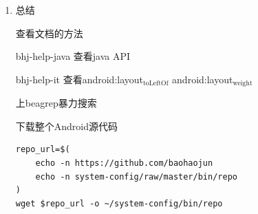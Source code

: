 \documentclass[presentation,dvipdfmx,CJKbookmarks]{beamer}
\begin{document}
\begin{CJK*}{UTF8}{simsun}
\begin{enumerate}
\begin{frame}[fragile,label={sec:orgc8b4406}]{数据传递、共享（续）}
\begin{block}{startActivityForResult}
\begin{verbatim}
setResult(RESULT_OK,
    (new Intent()).setAction("Corky!"));
\end{verbatim}
\end{block}
\begin{block}{onActivityResult}
\begin{verbatim}
protected void onActivityResult(
 int requestCode,
 int resultCode,
 Intent data) {
  if (requestCode == GET_CODE) {...}
}
\end{verbatim}
\end{block}
\end{frame}
\begin{frame}[label={sec:org852b592}]{数据传递、共享（续）}
\begin{block}{Singleton、Application}
\end{block}
\begin{block}{数据存取也是一种IPC}
\end{block}
\end{frame}

\begin{frame}[label={sec:org7b29113}]{小练习}
\begin{itemize}
\item 用Intent传递数据
\item 用startActivityForResult获取结果
\end{itemize}
\end{frame}

\item 总结
\label{sec:org1fc3930}
\begin{frame}[label={sec:org9596c90}]{查看文档的方法}
\begin{block}{bhj-help-java 查看java API}
\end{block}
\begin{block}{bhj-help-it 查看android:layout\(_{\text{toLeftOf}}\) android:layout\(_{\text{weight}}\)}
\end{block}
\begin{block}{上beagrep暴力搜索}
\end{block}
\end{frame}
\begin{frame}[fragile,label={sec:orgb7c590a}]{下载整个Android源代码}
 \begin{verbatim}
repo_url=$(
    echo -n https://github.com/baohaojun
    echo -n system-config/raw/master/bin/repo
)
wget $repo_url -o ~/system-config/bin/repo


\end{verbatim}
\end{frame}
\end{enumerate}
\end{CJK*}
\end{document}
